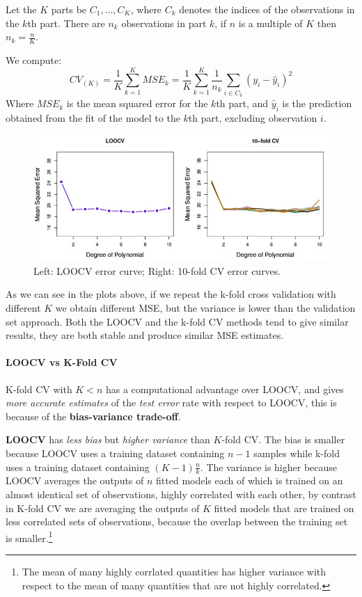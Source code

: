 Let the $K$ parts be $C_1, \dots, C_K$, where $C_k$ denotes the indices of the observations in the $k$th part. There are $n_k$ observations in part $k$, if $n$ is a multiple of $K$ then $n_k = \frac{n}{K}$.

We compute:
\[
    CV_{(K)} = \frac{1}{K} \sum_{k=1}^{K} MSE_k = \frac{1}{K} \sum_{k=1}^{K} \frac{1}{n_k} \sum_{i \in C_k} (y_i - \hat{y}_i)^2
\]
Where $MSE_k$ is the mean squared error for the $k$th part, and $\hat{y}_i$ is the prediction obtained from the fit of the model to the $k$th part, excluding observation $i$.

\begin{figure}[ht]
    \centering
    \includegraphics[width=0.8\linewidth]{./figures/lec_15_k_fold_cv.png}
    \caption{Left: LOOCV error curve; Right: 10-fold CV error curves.}
    \label{fig:lec_15_k_fold_cv}
\end{figure}

As we can see in the plots above, if we repeat the k-fold cross validation with different $K$ we obtain different MSE, but the variance is lower than the validation set approach. Both the LOOCV and the k-fold CV methods tend to give similar results, they are both stable and produce similar MSE estimates.

\paragraph*{LOOCV vs K-Fold CV}
K-fold CV with $K < n$ has a computational advantage over LOOCV, and gives \textit{more accurate estimates} of the \textit{test error} rate with respect to LOOCV, this is because of the \textbf{bias-variance trade-off}.

\textbf{LOOCV} has \textit{less bias} but \textit{higher variance} than $K$-fold CV. The bias is smaller because LOOCV uses a training dataset containing $n-1$ samples while k-fold uses a training dataset containing $(K-1) \frac{n}{k}$. The variance is higher because LOOCV averages the outputs of $n$ fitted models each of which is trained on an almost identical set of observations, highly correlated with each other, by contrast in K-fold CV we are averaging the outputs of $K$ fitted models that are trained on less correlated sets of observations, because the overlap between the training set is smaller.\footnote{The mean of many highly corrlated quantities has higher variance with respect to the mean of many quantities that are not highly correlated.}

